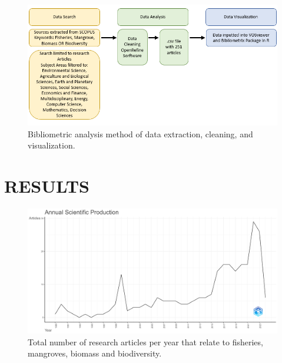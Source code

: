 \documentclass[
  12pt,
]{article}
\begin{document}
\begin{figure}
\includegraphics[width=10.5in]{MethodsFig} \caption{Bibliometric analysis method of data extraction, cleaning, and visualization. \label{MethodsFig}}\label{fig:MethodsFig}
\end{figure}

\section{RESULTS}\label{results}

\begin{figure}
\includegraphics[width=1\linewidth]{AnnualScientificProduction} \caption{Total number of research articles per year that relate to fisheries, mangroves, biomass and biodiversity. \label{AnnualScientificProduction}}\label{fig:AnnualScientificProduction}
\end{figure}
\end{document}
